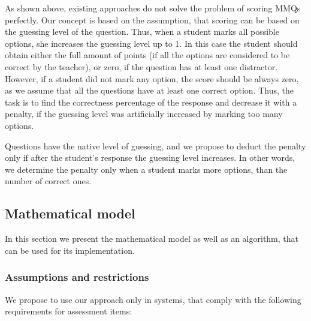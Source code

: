 As shown above, existing approaches do not solve the problem of scoring MMQs perfectly.
Our concept is based on the assumption, that scoring can be based on the guessing level of the question.
Thus, when a student marks all possible options, she increases the guessing level up to 1. 
In this case the student should obtain either the full amount of points (if all the options are considered to be correct by the teacher), or zero, if the question has at least one distractor. 
However, if a student did not mark any option, the score should be always zero, as we assume that all the questions have at least one correct option.
Thus, the task is to find the correctness percentage of the response and decrease it with a penalty, if the guessing level was artificially increased by marking too many options.

Questions have the native level of guessing, and we propose to deduct the penalty only if after the student's response the guessing level increases.
In other words, we determine the penalty only when a student marks more options, than the number of correct ones.

\subsection{Mathematical model} %
\label{subsec:math_model}

In this section we present the mathematical model as well as an algorithm, that can be used for its implementation. 

\subsubsection{Assumptions and restrictions}
\label{subsec:restrictions}

We propose to use our approach only in systems, that comply with the following requirements for assessment items:

